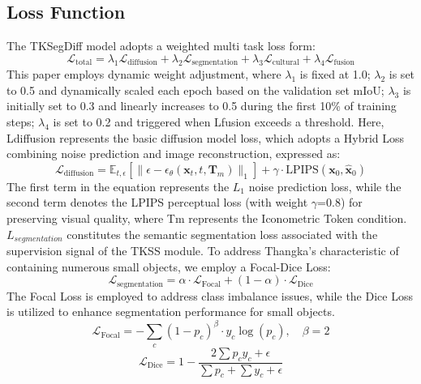 \documentclass[sn-mathphys]{sn-jnl}%
\theoremstyle{thmstyleone}%
\theoremstyle{thmstyletwo}%
\theoremstyle{thmstylethree}%
\begin{document}
\subsection{Loss Function}
The TKSegDiff model adopts a weighted multi task loss form:
\begin{equation}
	\mathcal{L}_{\mathrm{total}}=\lambda_1\mathcal{L}_{\mathrm{diffusion}}+\lambda_2\mathcal{L}_{\text{segmentation}}+\lambda_3\mathcal{L}_{\mathrm{cultural}}+\lambda_4\mathcal{L}_{\mathrm{fusion}}
	\label{eq13}
\end{equation}
This paper employs dynamic weight adjustment, where $ {\lambda _1} $ is fixed at 1.0; $ {\lambda _2} $ is set to 0.5 and dynamically scaled each epoch based on the validation set mIoU; $ {\lambda _3} $ is initially set to 0.3 and linearly increases to 0.5 during the first 10\% of training steps; $ {\lambda _4} $ is set to 0.2 and triggered when Lfusion exceeds a threshold. Here, Ldiffusion represents the basic diffusion model loss, which adopts a Hybrid Loss combining noise prediction and image reconstruction, expressed as:
\begin{equation}
	\mathcal{L}_{\mathrm{diffusion}}=\mathbb{E}_{t,\epsilon}\left[\|\epsilon-\epsilon_\theta(\mathbf{x}_t,t,\mathbf{T}_m)\|_1\right]+\gamma\cdot\mathrm{LPIPS}(\mathbf{x}_0,\hat{\mathbf{x}}_0)
	\label{eq14}
\end{equation}
The first term in the equation represents the $ L_1 $ noise prediction loss, while the second term denotes the LPIPS perceptual loss (with weight $\gamma $=0.8) for preserving visual quality, where Tm represents the Iconometric Token condition. $L_{segmentation}$ constitutes the semantic segmentation loss associated with the supervision signal of the TKSS module. To address Thangka's characteristic of containing numerous small objects, we employ a Focal-Dice Loss:
\begin{equation}
	\mathcal{L}_{\mathrm{segmentation}}=\alpha\cdot\mathcal{L}_{\mathrm{Focal}}+(1-\alpha)\cdot\mathcal{L}_{\mathrm{Dice}}
	\label{eq15}
\end{equation}
The Focal Loss is employed to address class imbalance issues, while the Dice Loss is utilized to enhance segmentation performance for small objects.
\begin{equation}
	\mathcal{L}_{\mathrm{Focal}}=-\sum_c(1-p_c)^\beta\cdot y_c\log(p_c),\quad\beta=2
	\label{eq16}
\end{equation}
\begin{equation}
	\mathcal{L}_{\mathrm{Dice}}=1-\frac{2\sum p_cy_c+\epsilon}{\sum p_c+\sum y_c+\epsilon}
	\label{eq17}
\end{equation}
\end{document}

